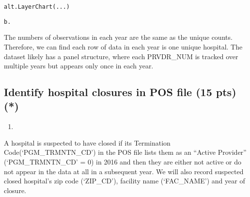 \documentclass[
  letterpaper,
  DIV=11,
  numbers=noendperiod]{scrartcl}
\providecommand{\tightlist}{%
  \setlength{\itemsep}{0pt}\setlength{\parskip}{0pt}}\usepackage{longtable,booktabs,array}
\begin{document}
\begin{verbatim}
alt.LayerChart(...)
\end{verbatim}

\begin{verbatim}
b.
\end{verbatim}

The numbers of observations in each year are the same as the unique
counts. Therefore, we can find each row of data in each year is one
unique hospital. The dataset likely has a panel structure, where each
PRVDR\_NUM is tracked over multiple years but appears only once in each
year.

\subsection{Identify hospital closures in POS file (15 pts)
(*)}\label{identify-hospital-closures-in-pos-file-15-pts}

\begin{enumerate}
\def\labelenumi{\arabic{enumi}.}
\tightlist
\item
\end{enumerate}

A hospital is suspected to have closed if its Termination
Code(`PGM\_TRMNTN\_CD') in the POS file lists them as an ``Active
Provider'' (`PGM\_TRMNTN\_CD' = 0) in 2016 and then they are either not
active or do not appear in the data at all in a subsequent year. We will
also record suspected closed hospital's zip code (`ZIP\_CD'), facility
name (`FAC\_NAME') and year of closure.
\end{document}
